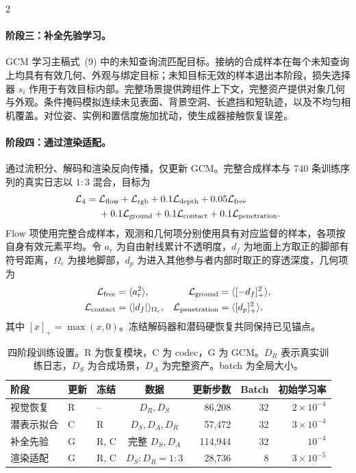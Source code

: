 \begin{multicols}{2}
\paragraph{阶段三：补全先验学习。}
GCM 学习主稿式~(9) 中的未知查询流匹配目标。接纳的合成样本在每个未知查询上均具有有效几何、外观与绑定目标；未知目标无效的样本退出本阶段，损失选择器 $s_i$ 作用于有效目标内部。完整场景提供跨组件上下文，完整资产提供对象几何与外观。条件掩码模拟连续未见表面、背景空洞、长遮挡和短轨迹，以及不均匀相机覆盖。对位姿、实例和置信度施加扰动，使生成器接触恢复误差。

\paragraph{阶段四：通过渲染适配。}
通过流积分、解码和渲染反向传播，仅更新 GCM。完整合成样本与 740 条训练序列的真实日志以 $1{:}3$ 混合，目标为
\begin{align}
\mathcal L_4={}&\mathcal L_{\rm flow}+\mathcal L_{\rm rgb}
+0.1\mathcal L_{\rm depth}+0.05\mathcal L_{\rm free}\nonumber\\
&+0.1\mathcal L_{\rm ground}+0.1\mathcal L_{\rm contact}
+0.1\mathcal L_{\rm penetration}.
\label{eq:adaptation}
\end{align}
Flow 项使用完整合成样本，观测和几何项分别使用具有对应监督的样本，各项按自身有效元素平均。令 $a_r$ 为自由射线累计不透明度，$d_f$ 为地面上方取正的脚部有符号距离，$\Omega_c$ 为接地脚部，$d_p$ 为进入其他参与者内部时取正的穿透深度，几何项为
\begin{align}
\mathcal L_{\rm free}&=\langle a_r^2\rangle,&
\mathcal L_{\rm ground}&=\langle[-d_f]_+^2\rangle,\nonumber\\
\mathcal L_{\rm contact}&=\langle|d_f|\rangle_{\Omega_c},&
\mathcal L_{\rm penetration}&=\langle[d_p]_+^2\rangle,
\end{align}
其中 $[x]_+=\max(x,0)$。冻结解码器和潜码硬恢复共同保持已见锚点。

\end{multicols}
\begin{table}[H]
\centering\small
\caption{四阶段训练设置。R 为恢复模块，C 为 codec，G 为 GCM。$D_R$ 表示真实训练日志，$D_S$ 为合成场景，$D_A$ 为完整资产。batch 为全局大小。}
\label{tab:training-schedule}
\begin{tabular}{@{}lllc rrr@{}}
\toprule
阶段 & 更新 & 冻结 & 数据 & 更新步数 & Batch & 初始学习率 \\
\midrule
视觉恢复 & R & -- & $D_R,D_S$ & 86,208 & 32 & $2\times10^{-4}$ \\
潜表示拟合 & C & R & $D_S,D_A,D_R$ & 57,472 & 32 & $3\times10^{-4}$ \\
补全先验 & G & R, C & 完整 $D_S,D_A$ & 114,944 & 32 & $10^{-4}$ \\
渲染适配 & G & R, C & $D_S:D_R=1:3$ & 28,736 & 8 & $3\times10^{-5}$ \\
\bottomrule
\end{tabular}
\end{table}
